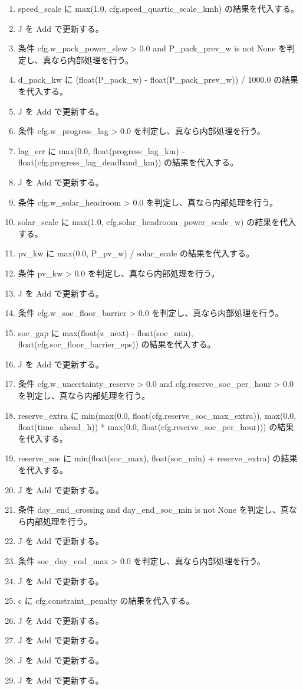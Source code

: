 \documentclass[a4paper,11pt]{article}
\begin{document}
\begin{enumerate}[leftmargin=1.8em]
\item   speed\_scale に max(1.0, cfg.speed\_quartic\_scale\_kmh) の結果を代入する。
\item   J を Add で更新する。
\item 条件 cfg.w\_pack\_power\_slew > 0.0 and P\_pack\_prev\_w is not None を判定し、真なら内部処理を行う。
\item   d\_pack\_kw に (float(P\_pack\_w) - float(P\_pack\_prev\_w)) / 1000.0 の結果を代入する。
\item   J を Add で更新する。
\item 条件 cfg.w\_progress\_lag > 0.0 を判定し、真なら内部処理を行う。
\item   lag\_err に max(0.0, float(progress\_lag\_km) - float(cfg.progress\_lag\_deadband\_km)) の結果を代入する。
\item   J を Add で更新する。
\item 条件 cfg.w\_solar\_headroom > 0.0 を判定し、真なら内部処理を行う。
\item   solar\_scale に max(1.0, cfg.solar\_headroom\_power\_scale\_w) の結果を代入する。
\item   pv\_kw に max(0.0, P\_pv\_w) / solar\_scale の結果を代入する。
\item   条件 pv\_kw > 0.0 を判定し、真なら内部処理を行う。
\item     J を Add で更新する。
\item 条件 cfg.w\_soc\_floor\_barrier > 0.0 を判定し、真なら内部処理を行う。
\item   soc\_gap に max(float(z\_next) - float(soc\_min), float(cfg.soc\_floor\_barrier\_eps)) の結果を代入する。
\item   J を Add で更新する。
\item 条件 cfg.w\_uncertainty\_reserve > 0.0 and cfg.reserve\_soc\_per\_hour > 0.0 を判定し、真なら内部処理を行う。
\item   reserve\_extra に min(max(0.0, float(cfg.reserve\_soc\_max\_extra)), max(0.0, float(time\_ahead\_h)) * max(0.0, float(cfg.reserve\_soc\_per\_hour))) の結果を代入する。
\item   reserve\_soc に min(float(soc\_max), float(soc\_min) + reserve\_extra) の結果を代入する。
\item   J を Add で更新する。
\item 条件 day\_end\_crossing and day\_end\_soc\_min is not None を判定し、真なら内部処理を行う。
\item   J を Add で更新する。
\item   条件 soc\_day\_end\_max > 0.0 を判定し、真なら内部処理を行う。
\item     J を Add で更新する。
\item c に cfg.constraint\_penalty の結果を代入する。
\item J を Add で更新する。
\item J を Add で更新する。
\item J を Add で更新する。
\item J を Add で更新する。
            \end{enumerate}
\end{document}
